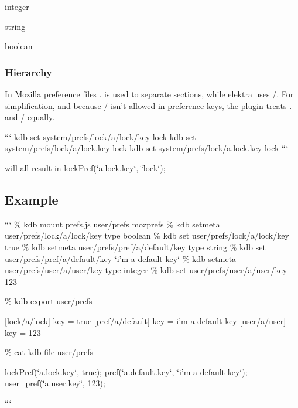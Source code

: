 \begin{DoxyItemize}
\item {\ttfamily integer}
\item {\ttfamily string}
\item {\ttfamily boolean}
\end{DoxyItemize}

\subsubsection*{Hierarchy}

In Mozilla preference files {\ttfamily .} is used to separate sections, while elektra uses {\ttfamily /}. For simplification, and because {\ttfamily /} isn't allowed in preference keys, the plugin treats {\ttfamily .} and {\ttfamily /} equally.

``` kdb set system/prefs/lock/a/lock/key lock kdb set system/prefs/lock/a/lock.\+key lock kdb set system/prefs/lock/a.\+lock.\+key lock ```

will all result in {\ttfamily lock\+Pref(\char`\"{}a.\+lock.\+key\char`\"{}, \char`\"{}lock\char`\"{});}

\subsection*{Example}

``` \% kdb mount prefs.\+js user/prefs mozprefs \% kdb setmeta user/prefs/lock/a/lock/key type boolean \% kdb set user/prefs/lock/a/lock/key true \% kdb setmeta user/prefs/pref/a/default/key type string \% kdb set user/prefs/pref/a/default/key \char`\"{}i'm a default key\char`\"{} \% kdb setmeta user/prefs/user/a/user/key type integer \% kdb set user/prefs/user/a/user/key 123

\% kdb export user/prefs

\mbox{[}lock/a/lock\mbox{]} key = true \mbox{[}pref/a/default\mbox{]} key = i'm a default key \mbox{[}user/a/user\mbox{]} key = 123

\% cat {\ttfamily kdb file user/prefs}

lock\+Pref(\char`\"{}a.\+lock.\+key\char`\"{}, true); pref(\char`\"{}a.\+default.\+key\char`\"{}, \char`\"{}i'm a default key\char`\"{}); user\+\_\+pref(\char`\"{}a.\+user.\+key\char`\"{}, 123);

``` 